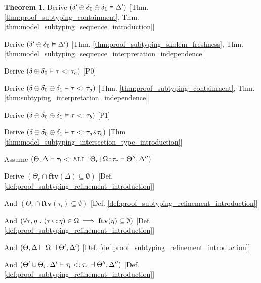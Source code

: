 \documentclass[acmsmall]{acmart}
\theoremstyle{definition}
\newtheorem{theorem}{Theorem}[section]
\begin{document}
\begin{theorem}
  \item \I\I \N Derive $(
    \delta' \oplus \delta_0 \oplus \delta_1 \vDash \Delta'
  )$ [Thm. \ref{thm:proof_subtyping_containment}, Thm. \ref{thm:model_subtyping_sequence_introduction}]
  \item \I\I \N Derive $(
    \delta' \oplus \delta_0 \vDash \Delta'
  )$ [Thm. \ref{thm:proof_subtyping_skolem_freshness}, Thm. \ref{thm:model_subtyping_sequence_interpretation_independence}]
  \item \I\I \N Derive $(
    \delta \oplus \delta_0 \vDash \tau <: \tau_a
  )$ [P0]

  \item \I\I \N Derive $(
    \delta \oplus \delta_0 \oplus \delta_1 \vDash \tau <: \tau_a
  )$ [Thm. \ref{thm:proof_subtyping_containment}, Thm. \ref{thm:subtyping_interpretation_independence}]

  \item \I\I \N Derive $(
    \delta \oplus \delta_0 \oplus \delta_1 \vDash \tau <: \tau_b
  )$ [P1]

  \item \I\I \N Derive $(
    \delta \oplus \delta_0 \oplus \delta_1 \satisfies \tau \subtypes \tau_a \J{\&} \tau_b
  )$ [Thm \ref{thm:model_subtyping_intersection_type_introduction}]


  \item \N Assume $(
    \Theta, \Delta \entails \tau_l \subtypes \J{ALL[}\Theta_r\J{]}\Omega \J{:} \tau_r \given \Theta'', \Delta''
  )$
  \item \I \N Derive $(
    \Theta_r \cap \textbf{ftv}(\Delta) \subseteq \emptyset
  )$ [Def. \ref{def:proof_subtyping_refinement_introduction}]
  \item \I \N And $(
    \Theta_r \cap \textbf{ftv}(\tau_l) \subseteq \emptyset
  )$ [Def. \ref{def:proof_subtyping_refinement_introduction}]
  \item \I \N And $(
    \forall \tau, \eta \qua (\tau \J{<:} \eta) \in \Omega \implies \textbf{ftv}(\eta) \subseteq \emptyset
  )$ [Def. \ref{def:proof_subtyping_refinement_introduction}]
  \item \I \N And $(
    \Theta, \Delta \vdash \Omega \dashv \Theta', \Delta'
  )$ [Def. \ref{def:proof_subtyping_refinement_introduction}]
  \item \I \N And $(
    \Theta' \cup \Theta_r, \Delta' \vdash
    \tau_l <: \tau_r \dashv \Theta'', \Delta''
  )$ [Def. \ref{def:proof_subtyping_refinement_introduction}]


\end{theorem}
\end{document}
